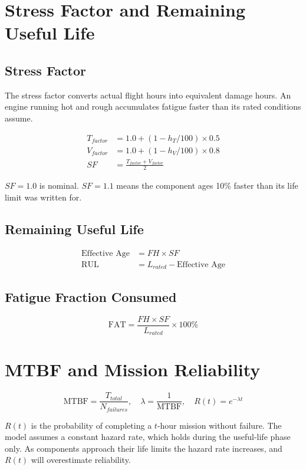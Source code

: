 \documentclass[11pt, a4paper]{report}
\begin{document}
\section{Stress Factor and Remaining Useful Life}

\subsection{Stress Factor}

The stress factor converts actual flight hours into equivalent damage hours.
An engine running hot and rough accumulates fatigue faster than its rated
conditions assume.

\begin{align}
  T_{factor} &= 1.0 + (1 - h_T/100) \times 0.5 \\[4pt]
  V_{factor} &= 1.0 + (1 - h_V/100) \times 0.8 \\[4pt]
  SF         &= \frac{T_{factor} + V_{factor}}{2}
\end{align}

$SF = 1.0$ is nominal. $SF = 1.1$ means the component ages 10\% faster than
its life limit was written for.

\subsection{Remaining Useful Life}

\begin{align}
  \text{Effective Age} &= FH \times SF \\[4pt]
  \text{RUL}           &= L_{rated} - \text{Effective Age}
\end{align}

\subsection{Fatigue Fraction Consumed}

\[
\text{FAT} = \frac{FH \times SF}{L_{rated}} \times 100\%
\]

\section{MTBF and Mission Reliability}
\label{sec:mtbf}

\[
\text{MTBF} = \frac{T_{total}}{N_{failures}}, \quad
\lambda = \frac{1}{\text{MTBF}}, \quad
R(t) = e^{-\lambda t}
\]

$R(t)$ is the probability of completing a $t$-hour mission without failure.
The model assumes a constant hazard rate, which holds during the useful-life
phase only. As components approach their life limits the hazard rate increases,
and $R(t)$ will overestimate reliability.
\end{document}

